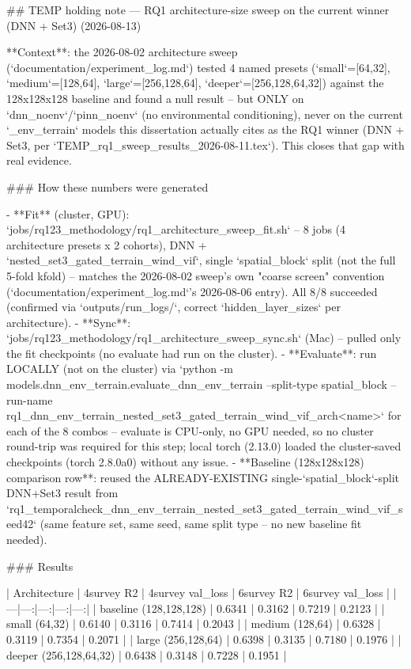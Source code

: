 ## TEMP holding note — RQ1 architecture-size sweep on the current winner (DNN + Set3) (2026-08-13)

**Context**: the 2026-08-02 architecture sweep (`documentation/experiment_log.md`) tested 4 named
presets (`small`=[64,32], `medium`=[128,64], `large`=[256,128,64], `deeper`=[256,128,64,32]) against
the 128x128x128 baseline and found a null result -- but ONLY on `dnn_noenv`/`pinn_noenv` (no
environmental conditioning), never on the current `_env_terrain` models this dissertation actually
cites as the RQ1 winner (DNN + Set3, per `TEMP_rq1_sweep_results_2026-08-11.tex`). This closes that
gap with real evidence.

### How these numbers were generated

- **Fit** (cluster, GPU): `jobs/rq123_methodology/rq1_architecture_sweep_fit.sh` -- 8 jobs (4
  architecture presets x 2 cohorts), DNN + `nested_set3_gated_terrain_wind_vif`, single
  `spatial_block` split (not the full 5-fold kfold) -- matches the 2026-08-02 sweep's own
  "coarse screen" convention (`documentation/experiment_log.md`'s 2026-08-06 entry). All 8/8
  succeeded (confirmed via `outputs/run_logs/`, correct `hidden_layer_sizes` per architecture).
- **Sync**: `jobs/rq123_methodology/rq1_architecture_sweep_sync.sh` (Mac) -- pulled only the fit
  checkpoints (no evaluate had run on the cluster).
- **Evaluate**: run LOCALLY (not on the cluster) via
  `python -m models.dnn_env_terrain.evaluate_dnn_env_terrain --split-type spatial_block --run-name
  rq1_dnn_env_terrain_nested_set3_gated_terrain_wind_vif_arch<name>` for each of the 8 combos --
  evaluate is CPU-only, no GPU needed, so no cluster round-trip was required for this step; local
  torch (2.13.0) loaded the cluster-saved checkpoints (torch 2.8.0a0) without any issue.
- **Baseline (128x128x128) comparison row**: reused the ALREADY-EXISTING single-`spatial_block`-split
  DNN+Set3 result from `rq1_temporalcheck_dnn_env_terrain_nested_set3_gated_terrain_wind_vif_seed42`
  (same feature set, same seed, same split type -- no new baseline fit needed).

### Results

| Architecture | 4survey R2 | 4survey val_loss | 6survey R2 | 6survey val_loss |
|---|---:|---:|---:|---:|
| baseline (128,128,128) | 0.6341 | 0.3162 | 0.7219 | 0.2123 |
| small (64,32) | 0.6140 | 0.3116 | 0.7414 | 0.2043 |
| medium (128,64) | 0.6328 | 0.3119 | 0.7354 | 0.2071 |
| large (256,128,64) | 0.6398 | 0.3135 | 0.7180 | 0.1976 |
| deeper (256,128,64,32) | 0.6438 | 0.3148 | 0.7228 | 0.1951 |

